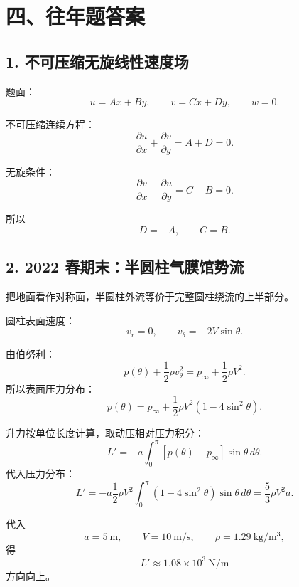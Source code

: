 ﻿\documentclass[UTF8,zihao=-4]{ctexart}
\begin{document}
\section*{四、往年题答案}

\subsection*{1. 不可压缩无旋线性速度场}

题面：
\[
u=Ax+By,\qquad v=Cx+Dy,\qquad w=0.
\]

不可压缩连续方程：
\[
\frac{\partial u}{\partial x}+\frac{\partial v}{\partial y}=A+D=0.
\]

无旋条件：
\[
\frac{\partial v}{\partial x}-\frac{\partial u}{\partial y}=C-B=0.
\]

所以
\[
\boxed{D=-A,\qquad C=B.}
\]

\subsection*{2. 2022 春期末：半圆柱气膜馆势流}

把地面看作对称面，半圆柱外流等价于完整圆柱绕流的上半部分。

圆柱表面速度：
\[
v_r=0,\qquad v_\theta=-2V\sin\theta.
\]

由伯努利：
\[
p(\theta)+\frac12\rho v_\theta^2
=p_\infty+\frac12\rho V^2.
\]
所以表面压力分布：
\[
\boxed{
p(\theta)=p_\infty+\frac12\rho V^2(1-4\sin^2\theta)
}.
\]

升力按单位长度计算，取动压相对压力积分：
\[
L'=-a\int_0^\pi [p(\theta)-p_\infty]\sin\theta\,d\theta.
\]
代入压力分布：
\[
L'
=-a\frac12\rho V^2
\int_0^\pi (1-4\sin^2\theta)\sin\theta\,d\theta
=\frac53\rho V^2a.
\]

代入
\[
a=5\ \mathrm{m},\qquad V=10\ \mathrm{m/s},\qquad \rho=1.29\ \mathrm{kg/m^3},
\]
得
\[
\boxed{
L'\approx1.08\times10^3\ \mathrm{N/m}
}
\]
方向向上。
\end{document}

